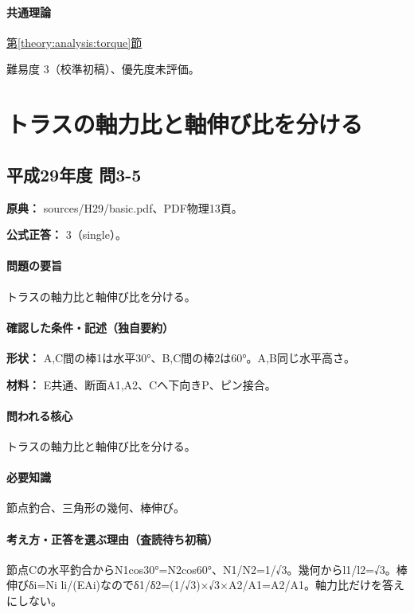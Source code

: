 \paragraph{共通理論} \hyperref[theory:analysis:torque]{第\ref*{theory:analysis:torque}節}

\par 難易度 3（校準初稿）、優先度未評価。

\section{トラスの軸力比と軸伸び比を分ける}

\subsection{平成29年度 問3-5}
\label{q:h29-reg-basic-3-5}

\noindent\textbf{原典：} sources/H29/basic.pdf、PDF物理13頁。

\textbf{公式正答：} 3（single）。

\paragraph{問題の要旨} トラスの軸力比と軸伸び比を分ける。

\paragraph{確認した条件・記述（独自要約）}\mbox{}\par

\noindent\textbf{形状：} A,C間の棒1は水平30°、B,C間の棒2は60°。A,B同じ水平高さ。\par

\noindent\textbf{材料：} E共通、断面A1,A2、Cへ下向きP、ピン接合。\par

\paragraph{問われる核心} トラスの軸力比と軸伸び比を分ける。

\paragraph{必要知識} 節点釣合、三角形の幾何、棒伸び。

\paragraph{考え方・正答を選ぶ理由（査読待ち初稿）} 節点Cの水平釣合からN1cos30°=N2cos60°、N1/N2=\allowbreak{}1/√3。幾何からl1/l2=√3。棒伸びδi=\allowbreak{}Ni li/(EAi)なのでδ1/δ2=\allowbreak{}(1/√3)×√3×A2/A1=\allowbreak{}A2/A1。軸力比だけを答えにしない。

